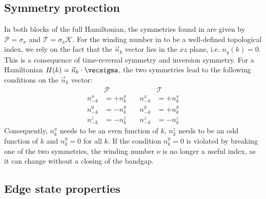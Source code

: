 \subsection{Symmetry protection}
In both blocks of the full Hamiltonian, the symmetries found in  are given by $\mathcal{P} = \sigma_x$ and $\mathcal{T}=\sigma_x \mathcal{K}$.
For the winding number in  to be a well-defined topological index, we rely on the fact that the $\vec{n}_k$ vector lies in the $xz$ plane, i.e. $n_y(k)=0$.
This is a consequence of time-reversal symmetry and inversion symmetry.
For a Hamiltonian $H(k) = \vec{n}_k \cdot \vecsigma$, the two symmetries lead to the following conditions on the $\vec{n}_k$ vector:
\begin{align}
    &\mathcal{P}       &\quad         &\mathcal{T} \\
    n^x_{-k} &= +n^x_k &\quad n^x_{-k} &= +n^x_k \\
    n^y_{-k} &= -n^y_k &\quad n^y_{-k} &= +n^y_k \\
    n^z_{-k} &= -n^z_k &\quad n^z_{-k} &= -n^z_k
\end{align}
Consequently, $n^x_k$ needs to be an even function of $k$, $n^z_k$ needs to be an odd function of $k$ and $n^y_k = 0$ for all $k$.
If the condition $n^y_k = 0$ is violated by breaking one of the two symmetries, the winding number $\nu$ is no longer a useful index, as it can change without a closing of the bandgap.


\subsection{Edge state properties}

